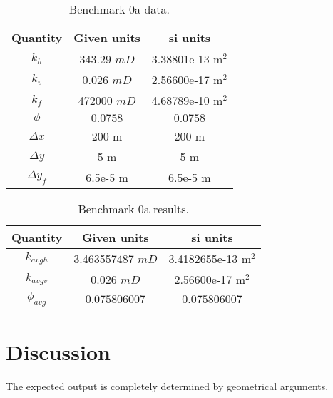 \documentclass{article}
\begin{document}
\begin{table}[H]
\begin{centering}
\begin{tabular}{|c|c|c|}
\hline 
Quantity & Given units & si units\tabularnewline
\hline 
\hline 
$k_{h}$ & 343.29 $mD$ & 3.38801e-13 $\si{\square\metre}$ \tabularnewline
\hline 
$k_{v}$ & 0.026 $mD$ & 2.56600e-17 $\si{\square\metre}$ \tabularnewline
\hline 
$k_{f}$ & 472000 $mD$ & 4.68789e-10 $\si{\square\metre}$ \tabularnewline
\hline 
$\phi$ & $0.0758$ & $0.0758$\tabularnewline
\hline 
$\Delta x$ & 200 $\si{\metre}$  & 200 $\si{\metre}$ \tabularnewline
\hline 
$\Delta y$ & 5 $\si{\metre}$  & 5 $\si{\metre}$ \tabularnewline
\hline 
$\Delta y_{f}$ & 6.5e-5 $\si{\metre}$  & 6.5e-5 $\si{\metre}$ \tabularnewline
\hline 
\end{tabular}
\par\end{centering}
\caption{Benchmark 0a data.}

\end{table}
\begin{table}[H]
\begin{centering}
\begin{tabular}{|c|c|c|}
\hline 
Quantity & Given units & si units\tabularnewline
\hline 
\hline 
$k_{avgh}$ & 3.463557487 $mD$ & 3.4182655e-13 $\si{\square\metre}$ \tabularnewline
\hline 
$k_{avgv}$ & 0.026 $mD$ & 2.56600e-17 $\si{\square\metre}$ \tabularnewline
\hline 
$\phi_{avg}$ & $0.075806007$ & $0.075806007$\tabularnewline
\hline 
\end{tabular}
\par\end{centering}
\caption{Benchmark 0a results.}
\end{table}

\section{Discussion}

The expected output is completely determined by geometrical arguments.
\end{document}
